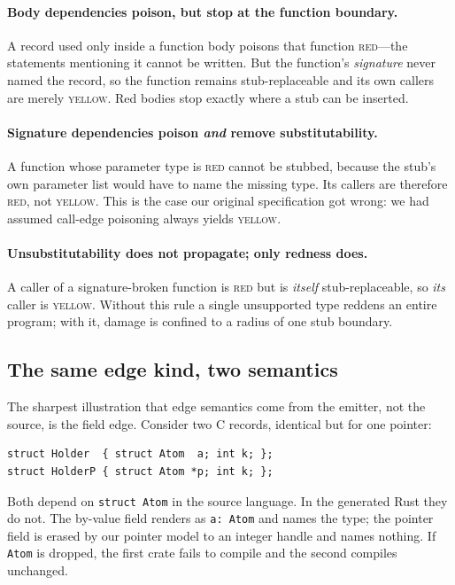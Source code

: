 \documentclass[10pt,twocolumn]{article}
\newcommand{\amber}[1]{\textcolor{camber}{\textsc{#1}}}
\newcommand{\red}[1]{\textcolor{cred}{\textsc{#1}}}
\begin{document}
\paragraph{Body dependencies poison, but stop at the function boundary.} A
record used only inside a function body poisons that function \red{red}---the
statements mentioning it cannot be written. But the function's \emph{signature}
never named the record, so the function remains stub-replaceable and its own
callers are merely \amber{yellow}. Red bodies stop exactly where a stub can be
inserted.

\paragraph{Signature dependencies poison \emph{and} remove
substitutability.} A function whose parameter type is \red{red} cannot be
stubbed, because the stub's own parameter list would have to name the missing
type. Its callers are therefore \red{red}, not \amber{yellow}. This is the
case our original specification got wrong: we had assumed call-edge poisoning
always yields \amber{yellow}.

\paragraph{Unsubstitutability does not propagate; only redness does.} A caller
of a signature-broken function is \red{red} but is \emph{itself}
stub-replaceable, so \emph{its} caller is \amber{yellow}. Without this rule a
single unsupported type reddens an entire program; with it, damage is confined
to a radius of one stub boundary.

\subsection{The same edge kind, two semantics}
\label{sec:field-indirect}

The sharpest illustration that edge semantics come from the emitter, not the
source, is the field edge. Consider two C records, identical but for one
pointer:

\begin{lstlisting}
struct Holder  { struct Atom  a; int k; };
struct HolderP { struct Atom *p; int k; };
\end{lstlisting}

Both depend on \texttt{struct Atom} in the source language. In the generated
Rust they do not. The by-value field renders as \texttt{a: Atom} and names the
type; the pointer field is erased by our pointer model to an integer handle
and names nothing. If \texttt{Atom} is dropped, the first crate fails to
compile and the second compiles unchanged.
\end{document}
